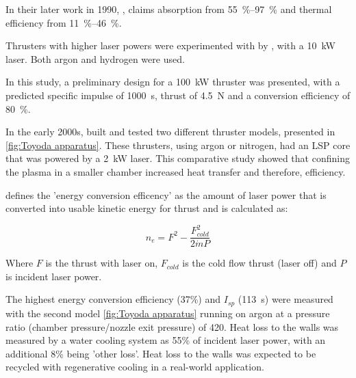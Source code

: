         In their later work in 1990, \textcite{zerkleLasersustainedArgonPlasmas1990}, claims absorption from \qtyrange{55}{97}{\%} and thermal efficiency from \qtyrange{11}{46}{\%}. %


        Thrusters with higher laser powers were experimented with by \textcite{blackLaserPropulsion10kW1995}, with a \qty{10}{kW}  laser. Both argon and hydrogen were used.

        In this study, a preliminary design for a \qty{100}{kW} thruster was presented, with a predicted specific impulse of \qty{1000}{s}, thrust of \qty{4.5}{N} and a conversion efficiency of \qty{80}{\%}.


        In the early 2000s, \textcite{toyodaThrustPerformanceCW2002} built and tested two different thruster models, presented in \autoref{fig:Toyoda apparatus}. These thrusters, using argon or nitrogen, had an LSP core that was powered by a \qty{2}{kW}  laser. This comparative study showed that confining the plasma in a smaller chamber increased heat transfer and therefore, efficiency. 
        
         defines the 'energy conversion efficency' as the amount of laser power that is converted into usable kinetic energy for thrust and is calculated as:

        \[ n_e = F^2 - \frac{F^2_{cold}}{2 \dot{m} P}\]

        Where $F$ is the thrust with laser on, $F_{cold}$ is the cold flow thrust (laser off) and $P$ is incident laser power.

        The highest energy conversion efficiency (37\%) and $I_{sp}$ (\qty{113}{s}) were measured with the second model \autoref{fig:Toyoda apparatus} running on argon at a pressure ratio (chamber pressure/nozzle exit pressure) of 420. Heat loss to the walls was measured by a water cooling system as 55\% of incident laser power, with an additional 8\% being 'other loss'. Heat loss to the walls was expected to be recycled with regenerative cooling in a real-world application.

